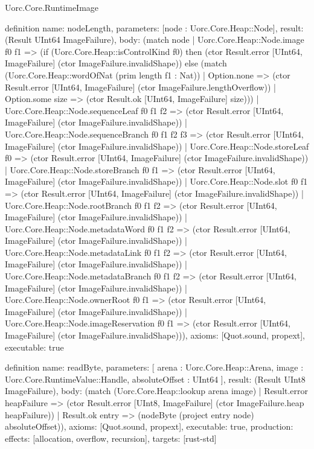 \begin{lexlean}{Uorc.Core.RuntimeImage}
\begin{semanticmodule}
definition{
  name: nodeLength,
  parameters: [node : Uorc.Core.Heap::Node],
  result: (Result UInt64 ImageFailure),
  body: (match node
    | Uorc.Core.Heap::Node.image f0 f1 => (if (Uorc.Core.Heap::isControlKind f0) then (ctor Result.error [UInt64, ImageFailure] (ctor ImageFailure.invalidShape)) else (match (Uorc.Core.Heap::wordOfNat (prim length f1 : Nat))
      | Option.none => (ctor Result.error [UInt64, ImageFailure] (ctor ImageFailure.lengthOverflow))
      | Option.some size => (ctor Result.ok [UInt64, ImageFailure] size)))
    | Uorc.Core.Heap::Node.sequenceLeaf f0 f1 f2 => (ctor Result.error [UInt64, ImageFailure] (ctor ImageFailure.invalidShape))
    | Uorc.Core.Heap::Node.sequenceBranch f0 f1 f2 f3 => (ctor Result.error [UInt64, ImageFailure] (ctor ImageFailure.invalidShape))
    | Uorc.Core.Heap::Node.storeLeaf f0 => (ctor Result.error [UInt64, ImageFailure] (ctor ImageFailure.invalidShape))
    | Uorc.Core.Heap::Node.storeBranch f0 f1 => (ctor Result.error [UInt64, ImageFailure] (ctor ImageFailure.invalidShape))
    | Uorc.Core.Heap::Node.slot f0 f1 => (ctor Result.error [UInt64, ImageFailure] (ctor ImageFailure.invalidShape))
    | Uorc.Core.Heap::Node.rootBranch f0 f1 f2 => (ctor Result.error [UInt64, ImageFailure] (ctor ImageFailure.invalidShape))
    | Uorc.Core.Heap::Node.metadataWord f0 f1 f2 => (ctor Result.error [UInt64, ImageFailure] (ctor ImageFailure.invalidShape))
    | Uorc.Core.Heap::Node.metadataLink f0 f1 f2 => (ctor Result.error [UInt64, ImageFailure] (ctor ImageFailure.invalidShape))
    | Uorc.Core.Heap::Node.metadataBranch f0 f1 f2 => (ctor Result.error [UInt64, ImageFailure] (ctor ImageFailure.invalidShape))
    | Uorc.Core.Heap::Node.ownerRoot f0 f1 => (ctor Result.error [UInt64, ImageFailure] (ctor ImageFailure.invalidShape))
    | Uorc.Core.Heap::Node.imageReservation f0 f1 => (ctor Result.error [UInt64, ImageFailure] (ctor ImageFailure.invalidShape))),
  axioms: [Quot.sound, propext],
  executable: true
}

definition{
  name: readByte,
  parameters: [
    arena : Uorc.Core.Heap::Arena,
    image : Uorc.Core.RuntimeValue::Handle,
    absoluteOffset : UInt64
  ],
  result: (Result UInt8 ImageFailure),
  body: (match (Uorc.Core.Heap::lookup arena image)
    | Result.error heapFailure => (ctor Result.error [UInt8, ImageFailure] (ctor ImageFailure.heap heapFailure))
    | Result.ok entry => (nodeByte (project entry node) absoluteOffset)),
  axioms: [Quot.sound, propext],
  executable: true,
  production: {effects: [allocation, overflow, recursion], targets: [rust-std]}
}


\end{semanticmodule}
\end{lexlean}
